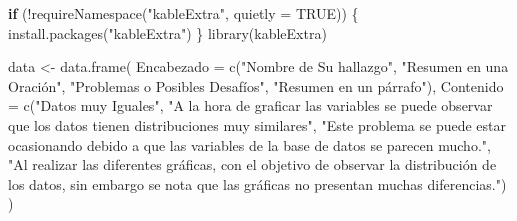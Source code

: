 \documentclass[
  letterpaper,
  DIV=11,
  numbers=noendperiod]{scrreprt}
\newenvironment{Shaded}{\begin{snugshade}}{\end{snugshade}}
\newcommand{\AttributeTok}[1]{\textcolor[rgb]{0.40,0.45,0.13}{#1}}
\newcommand{\ConstantTok}[1]{\textcolor[rgb]{0.56,0.35,0.01}{#1}}
\newcommand{\ControlFlowTok}[1]{\textcolor[rgb]{0.00,0.23,0.31}{\textbf{#1}}}
\newcommand{\FunctionTok}[1]{\textcolor[rgb]{0.28,0.35,0.67}{#1}}
\newcommand{\NormalTok}[1]{\textcolor[rgb]{0.00,0.23,0.31}{#1}}
\newcommand{\OtherTok}[1]{\textcolor[rgb]{0.00,0.23,0.31}{#1}}
\newcommand{\SpecialCharTok}[1]{\textcolor[rgb]{0.37,0.37,0.37}{#1}}
\newcommand{\StringTok}[1]{\textcolor[rgb]{0.13,0.47,0.30}{#1}}
\begin{document}
\begin{Shaded}
\begin{Highlighting}[]
\ControlFlowTok{if}\NormalTok{ (}\SpecialCharTok{!}\FunctionTok{requireNamespace}\NormalTok{(}\StringTok{"kableExtra"}\NormalTok{, }\AttributeTok{quietly =} \ConstantTok{TRUE}\NormalTok{)) \{}
  \FunctionTok{install.packages}\NormalTok{(}\StringTok{"kableExtra"}\NormalTok{)}
\NormalTok{\}}
\FunctionTok{library}\NormalTok{(kableExtra)}


\NormalTok{data }\OtherTok{\textless{}{-}} \FunctionTok{data.frame}\NormalTok{(}
  \AttributeTok{Encabezado =} \FunctionTok{c}\NormalTok{(}\StringTok{"Nombre de Su hallazgo"}\NormalTok{, }
                 \StringTok{"Resumen en una Oración"}\NormalTok{, }
                 \StringTok{"Problemas o Posibles Desafíos"}\NormalTok{, }
                 \StringTok{"Resumen en un párrafo"}\NormalTok{),}
  \AttributeTok{Contenido =} \FunctionTok{c}\NormalTok{(}\StringTok{"Datos muy Iguales"}\NormalTok{, }
                \StringTok{"A la hora de graficar las variables se puede observar que los datos tienen distribuciones muy similares"}\NormalTok{, }
                \StringTok{"Este problema se puede estar ocasionando debido a que las variables de la base de datos se parecen mucho."}\NormalTok{, }
                \StringTok{"Al realizar las diferentes gráficas, con el objetivo de observar la distribución de los datos, sin embargo se nota que las gráficas no presentan muchas diferencias."}\NormalTok{)}
\NormalTok{)}



\end{Highlighting}
\end{Shaded}
\end{document}
